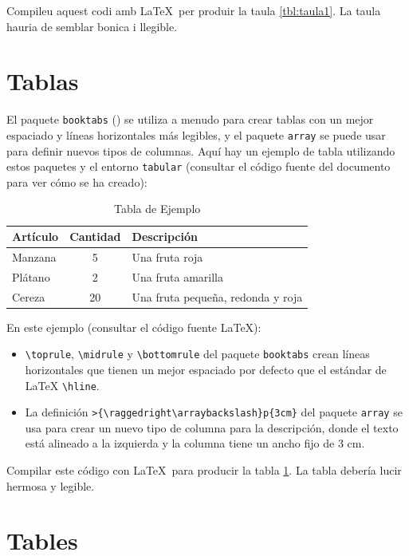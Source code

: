   Compileu aquest codi amb \LaTeX\ per produir la taula \ref{tbl:taula1}. La taula hauria de semblar bonica i llegible.

\or
\section{Tablas}
  
El paquete \texttt{booktabs} (\cite{booktabs}) se utiliza a menudo para crear tablas con un mejor espaciado y líneas horizontales más legibles, y el paquete \texttt{array} se puede usar para definir nuevos tipos de columnas. Aquí hay un ejemplo de tabla utilizando estos paquetes y el entorno \texttt{tabular} (consultar el código fuente del documento para ver cómo se ha creado):
  
\begin{table}[h]
  \centering
  \caption{Tabla de Ejemplo}\label{tbl:tabla1}
  \begin{tabular}{@{} l c >{\raggedright\arraybackslash}p{6cm} @{}}
    \toprule
    Artículo & Cantidad & Descripción \\
    \midrule
    Manzana & 5 & Una fruta roja \\
    Plátano & 2 & Una fruta amarilla \\
    Cereza & 20 & Una fruta pequeña, redonda y roja \\
    \bottomrule
  \end{tabular}
\end{table}
  
En este ejemplo (consultar el código fuente \LaTeX):
  
\begin{itemize}
  \item \verb|\toprule|, \verb|\midrule| y \verb|\bottomrule| del paquete \texttt{booktabs} crean líneas horizontales que tienen un mejor espaciado por defecto que el estándar de LaTeX \verb|\hline|.
  
  \item La definición \verb|>{\raggedright\arraybackslash}p{3cm}| del paquete \texttt{array} se usa para crear un nuevo tipo de columna para la descripción, donde el texto está alineado a la izquierda y la columna tiene un ancho fijo de 3 cm.
\end{itemize}
  
Compilar este código con \LaTeX\ para producir la tabla \ref{tbl:tabla1}. La tabla debería lucir hermosa y legible.

\else
  \section{Tables}
  
